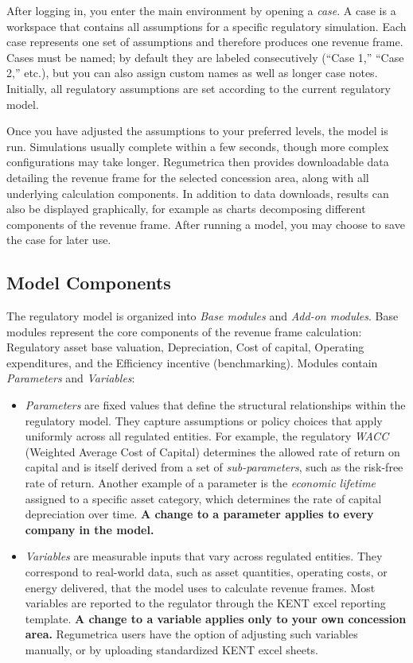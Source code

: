 After logging in, you enter the main environment by opening a \emph{case}. A case is a workspace that contains all assumptions for a specific regulatory simulation. Each case represents one set of assumptions and therefore produces one revenue frame. Cases must be named; by default they are labeled consecutively (``Case 1,'' ``Case 2,'' etc.), but you can also assign custom names as well as longer case notes. Initially, all regulatory assumptions are set according to the current regulatory model.

Once you have adjusted the assumptions to your preferred levels, the model is run. Simulations usually complete within a few seconds, though more complex configurations may take longer. Regumetrica then provides downloadable data detailing the revenue frame for the selected concession area, along with all underlying calculation components. In addition to data downloads, results can also be displayed graphically, for example as charts decomposing different components of the revenue frame. After running a model, you may choose to save the case for later use.

\subsection*{Model Components}
The regulatory model is organized into \emph{Base modules} and \emph{Add-on modules}. Base modules represent the core components of the revenue frame calculation: Regulatory asset base valuation, Depreciation, Cost of capital, Operating expenditures, and the Efficiency incentive (benchmarking). Modules contain \emph{Parameters} and \emph{Variables}:

\begin{itemize}
  \item \emph{Parameters} are fixed values that define the structural relationships within the regulatory model. They capture assumptions or policy choices that apply uniformly across all regulated entities. For example, the regulatory \emph{WACC} (Weighted Average Cost of Capital) determines the allowed rate of return on capital and is itself derived from a set of \emph{sub-parameters}, such as the risk-free rate of return. Another example of a parameter is the \emph{economic lifetime} assigned to a specific asset category, which determines the rate of capital depreciation over time. \textbf{A change to a parameter applies to every company in the model.}

  \item \emph{Variables} are measurable inputs that vary across regulated entities. They correspond to real-world data, such as asset quantities, operating costs, or energy delivered, that the model uses to calculate revenue frames. Most variables are reported to the regulator through the KENT excel reporting template. \textbf{A change to a variable applies only to your own concession area.} Regumetrica users have the option of adjusting such variables manually, or by uploading standardized KENT excel sheets.
\end{itemize}

